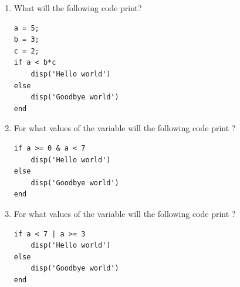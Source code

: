 \begin{enumerate}
\item \footnotemark[2]What will the following code print?
\begin{lstlisting}
a = 5;
b = 3;
c = 2;
if a < b*c
	disp('Hello world')
else
	disp('Goodbye world')
end
\end{lstlisting}

\item \footnotemark[2]For what values of the variable will the following code print ?
\begin{lstlisting}[label=lst:if_else_test2]
if a >= 0 & a < 7
	disp('Hello world')
else
	disp('Goodbye world')
end
\end{lstlisting}

\item \footnotemark[2]For what values of the variable will the following code print ?
\begin{lstlisting}[label=lst:if_else_test3]
if a < 7 | a >= 3
	disp('Hello world')
else
	disp('Goodbye world')
end
\end{lstlisting}
\end{enumerate}

